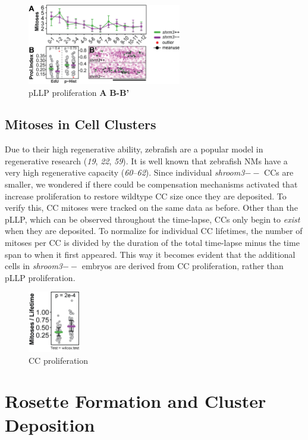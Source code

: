 \documentclass[11pt,singlespacinge,twoside]{reedthesis} %
\begin{document}
\begin{figure}

{\centering \includegraphics[width=0.6\textwidth]{figures/results/02_proliferation/prol_pllp} 

}

\caption[pLLP proliferation]{pLLP proliferation \textbf{A} \textbf{B-B'}}\label{fig:prolpllp}
\end{figure}
\hypertarget{mitoses-in-cell-clusters}{%
\subsection{Mitoses in Cell Clusters}\label{mitoses-in-cell-clusters}}

Due to their high regenerative ability, zebrafish are a popular model in regenerative research (\emph{19}, \emph{22}, \emph{59}). It is well known that zebrafish NMs have a very high regenerative capacity (\emph{60}--\emph{62}). Since individual \emph{shroom3}\(--\) CCs are smaller, we wondered if there could be compensation mechanisms activated that increase proliferation to restore wildtype CC size once they are deposited. To verify this, CC mitoses were tracked on the same data as before. Other than the pLLP, which can be observed throughout the time-lapse, CCs only begin to \emph{exist} when they are deposited. To normalize for individual CC lifetimes, the number of mitoses per CC is divided by the duration of the total time-lapse minus the time span to when it first appeared. This way it becomes evident that the additional cells in \emph{shroom3}\(--\) embryos are derived from CC proliferation, rather than pLLP proliferation.


\begin{figure}

{\centering \includegraphics[width=0.2\textwidth]{figures/results/02_proliferation/prol_cc} 

}

\caption[CC proliferation]{CC proliferation}\label{fig:prolcc}
\end{figure}
\hypertarget{rosette-formation-and-cluster-deposition}{%
\section{Rosette Formation and Cluster Deposition}\label{rosette-formation-and-cluster-deposition}}
\end{document}
